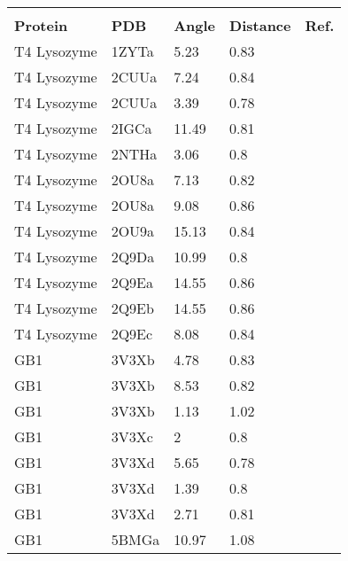 

\begin{center}
\begin{tabular}{l l l l r}
\toprule \\
\textbf{Protein} & \textbf{PDB} & \textbf{Angle} & \textbf{Distance} & \textbf{Ref.} \\
T4 Lysozyme & 1ZYTa & 5.23  & 0.83 & \citep*{Fleissner2009} \\
T4 Lysozyme & 2CUUa & 7.24  & 0.84 & \citep*{Fleissner2009} \\
T4 Lysozyme & 2CUUa & 3.39  & 0.78 & \citep*{Fleissner2009} \\
T4 Lysozyme & 2IGCa & 11.49 & 0.81 & \citep*{Guo2008} \\      
T4 Lysozyme & 2NTHa & 3.06  & 0.8  & \citep*{Guo2008} \\      
T4 Lysozyme & 2OU8a & 7.13  & 0.82 & \citep*{Guo2008} \\      
T4 Lysozyme & 2OU8a & 9.08 & 0.86 & \citep*{Guo2008} \\      
T4 Lysozyme & 2OU9a & 15.13 & 0.84 & \citep*{Guo2008} \\      
T4 Lysozyme & 2Q9Da & 10.99 & 0.8  & \citep*{Guo2008} \\      
T4 Lysozyme & 2Q9Ea & 14.55 & 0.86 & \citep*{Guo2008} \\      
T4 Lysozyme & 2Q9Eb & 14.55 & 0.86 & \citep*{Guo2008} \\      
T4 Lysozyme & 2Q9Ec & 8.08  & 0.84 & \citep*{Guo2008} \\      
GB1         & 3V3Xb & 4.78  & 0.83 & \citep*{Cunningham2012} \\ 
GB1         & 3V3Xb & 8.53  & 0.82 & \citep*{Cunningham2012} \\ 
GB1         & 3V3Xb & 1.13  & 1.02 & \citep*{Cunningham2012} \\ 
GB1         & 3V3Xc & 2     & 0.8  & \citep*{Cunningham2012} \\ 
GB1         & 3V3Xd & 5.65  & 0.78 & \citep*{Cunningham2012} \\ 
GB1         & 3V3Xd & 1.39  & 0.8  & \citep*{Cunningham2012} \\ 
GB1         & 3V3Xd & 2.71  & 0.81 & \citep*{Cunningham2012} \\ 
GB1         & 5BMGa & 10.97 & 1.08 & \citep*{Cunningham2016} \\ 

\end{tabular}
\end{center}
